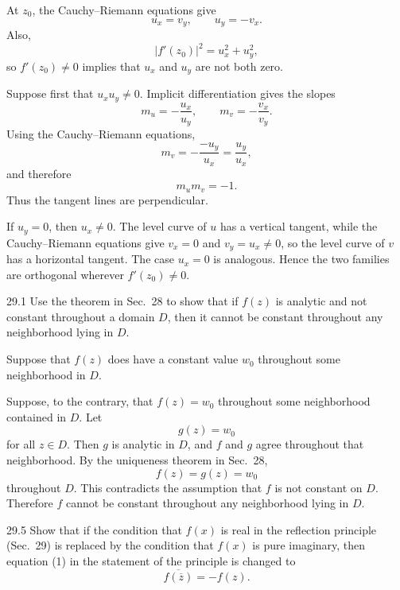 \documentclass[11pt,oneside]{article}
\begin{document}
\begin{solution}
At \(z_0\), the Cauchy--Riemann equations give
\[
    u_x=v_y,
    \qquad
    u_y=-v_x.
\]
Also,
\[
    |f'(z_0)|^2=u_x^2+u_y^2,
\]
so \(f'(z_0)\ne0\) implies that \(u_x\) and \(u_y\) are not both zero.

Suppose first that \(u_xu_y\ne0\). Implicit differentiation gives the slopes
\[
    m_u=-\frac{u_x}{u_y},
    \qquad
    m_v=-\frac{v_x}{v_y}.
\]
Using the Cauchy--Riemann equations,
\[
    m_v=-\frac{-u_y}{u_x}=\frac{u_y}{u_x},
\]
and therefore
\[
    m_um_v=-1.
\]
Thus the tangent lines are perpendicular.

If \(u_y=0\), then \(u_x\ne0\). The level curve of \(u\) has a vertical tangent, while the Cauchy--Riemann equations give \(v_x=0\) and \(v_y=u_x\ne0\), so the level curve of \(v\) has a horizontal tangent. The case \(u_x=0\) is analogous. Hence the two families are orthogonal wherever \(f'(z_0)\ne0\).
\end{solution}

\begin{exercise}{29.1}
Use the theorem in Sec.~28 to show that if \(f(z)\) is analytic and not constant throughout a domain \(D\), then it cannot be constant throughout any neighborhood lying in \(D\).
\begin{suggestion}
Suppose that \(f(z)\) does have a constant value \(w_0\) throughout some neighborhood in \(D\).
\end{suggestion}
\end{exercise}

\begin{solution}
Suppose, to the contrary, that \(f(z)=w_0\) throughout some neighborhood contained in \(D\). Let
\[
    g(z)=w_0
\]
for all \(z\in D\). Then \(g\) is analytic in \(D\), and \(f\) and \(g\) agree throughout that neighborhood. By the uniqueness theorem in Sec.~28,
\[
    f(z)=g(z)=w_0
\]
throughout \(D\). This contradicts the assumption that \(f\) is not constant on \(D\). Therefore \(f\) cannot be constant throughout any neighborhood lying in \(D\).
\end{solution}

\begin{exercise}{29.5}
Show that if the condition that \(f(x)\) is real in the reflection principle (Sec.~29) is replaced by the condition that \(f(x)\) is pure imaginary, then equation (1) in the statement of the principle is changed to
\[
    \overline{f(\overline z)}=-f(z).
\]
\end{exercise}
\end{document}
